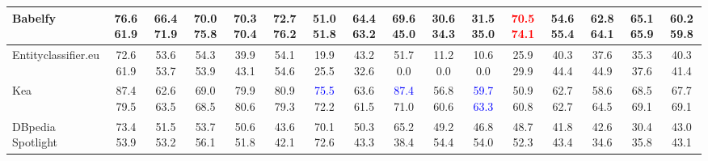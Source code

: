 \documentclass[11pt,a4paper]{article}
\newcommand{\redc}[1] {\textcolor{red}{#1}}
\newcommand{\bluec}[1] {\textcolor{blue}{#1}}
\begin{document}
\begin{table*}[!h]
\begin{adjustwidth}{-1cm}{}
\begin{tabular}{@{} l|c| c| c| c| c| c| c| c| c| c| c| c| c| c| c| @{}}
\hline
Babelfy& \multicolumn{1}{p{0.6cm}|}{76.6 61.9}& \multicolumn{1}{p{0.6cm}|}{66.4 71.9}& \multicolumn{1}{p{0.6cm}|}{70.0 75.8}& \multicolumn{1}{p{0.6cm}|}{70.3 70.4}& \multicolumn{1}{p{0.6cm}|}{72.7 76.2}& \multicolumn{1}{p{0.6cm}|}{51.0 51.8}& \multicolumn{1}{p{0.6cm}|}{64.4 63.2}& \multicolumn{1}{p{0.6cm}|}{69.6 45.0}& \multicolumn{1}{p{0.6cm}|}{30.6 34.3}& \multicolumn{1}{p{0.6cm}|}{31.5 35.0}& \multicolumn{1}{p{0.6cm}|}{\redc{70.5 74.1}}& \multicolumn{1}{p{0.6cm}|}{54.6 55.4}& \multicolumn{1}{p{0.6cm}|}{62.8 64.1}& \multicolumn{1}{p{0.6cm}|}{65.1 65.9}& \multicolumn{1}{p{0.6cm}|}{60.2 59.8}\\
\hline
Entityclassifier.eu& \multicolumn{1}{p{0.6cm}|}{72.6 61.9}& \multicolumn{1}{p{0.6cm}|}{53.6 53.7}& \multicolumn{1}{p{0.6cm}|}{54.3 53.9}& \multicolumn{1}{p{0.6cm}|}{39.9 43.1}& \multicolumn{1}{p{0.6cm}|}{54.1 54.6}& \multicolumn{1}{p{0.6cm}|}{19.9 25.5}& \multicolumn{1}{p{0.6cm}|}{43.2 32.6}& \multicolumn{1}{p{0.6cm}|}{51.7 0.0}& \multicolumn{1}{p{0.6cm}|}{11.2 0.0}& \multicolumn{1}{p{0.6cm}|}{10.6 0.0}& \multicolumn{1}{p{0.6cm}|}{25.9 29.9}& \multicolumn{1}{p{0.6cm}|}{40.3 44.4}& \multicolumn{1}{p{0.6cm}|}{37.6 44.9}& \multicolumn{1}{p{0.6cm}|}{35.3 37.6}& \multicolumn{1}{p{0.6cm}|}{40.3 41.4}\\
\hline
Kea& \multicolumn{1}{p{0.6cm}|}{87.4 79.5}& \multicolumn{1}{p{0.6cm}|}{62.6 63.5}& \multicolumn{1}{p{0.6cm}|}{69.0 68.5}& \multicolumn{1}{p{0.6cm}|}{79.9 80.6}& \multicolumn{1}{p{0.6cm}|}{80.9 79.3}& \multicolumn{1}{p{0.6cm}|}{\bluec{75.5} 72.2}& \multicolumn{1}{p{0.6cm}|}{63.6 61.5}& \multicolumn{1}{p{0.6cm}|}{\bluec{87.4} 71.0}& \multicolumn{1}{p{0.6cm}|}{56.8 60.6}& \multicolumn{1}{p{0.6cm}|}{\bluec{59.7 63.3}}& \multicolumn{1}{p{0.6cm}|}{50.9 60.8}& \multicolumn{1}{p{0.6cm}|}{62.7 62.7}& \multicolumn{1}{p{0.6cm}|}{58.6 64.5}& \multicolumn{1}{p{0.6cm}|}{68.5 69.1}& \multicolumn{1}{p{0.6cm}|}{67.7 69.1}\\
\hline
DBpedia Spotlight& \multicolumn{1}{p{0.6cm}|}{73.4 53.9}& \multicolumn{1}{p{0.6cm}|}{51.5 53.2}& \multicolumn{1}{p{0.6cm}|}{53.7 56.1}& \multicolumn{1}{p{0.6cm}|}{50.6 51.8}& \multicolumn{1}{p{0.6cm}|}{43.6 42.1}& \multicolumn{1}{p{0.6cm}|}{70.1 72.6}& \multicolumn{1}{p{0.6cm}|}{50.3 43.3}& \multicolumn{1}{p{0.6cm}|}{65.2 38.4}& \multicolumn{1}{p{0.6cm}|}{49.2 54.4}& \multicolumn{1}{p{0.6cm}|}{46.8 54.0}& \multicolumn{1}{p{0.6cm}|}{48.7 52.3}& \multicolumn{1}{p{0.6cm}|}{41.8 43.4}& \multicolumn{1}{p{0.6cm}|}{42.6 34.6}& \multicolumn{1}{p{0.6cm}|}{30.4 35.8}& \multicolumn{1}{p{0.6cm}|}{43.0 43.1}\\

\end{tabular}
\end{adjustwidth}
\end{table*}
\end{document}
